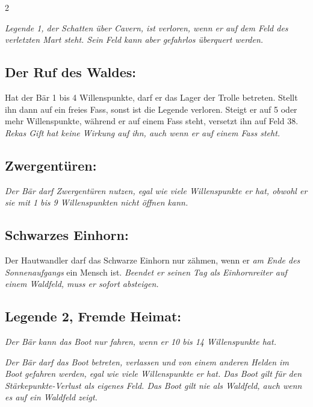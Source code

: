 \documentclass[10pt, a4paper, oneside]{book}
\newcommand{\fan}[1]{\textit{#1}}
\begin{document}
\begin{multicols*}{2}
\begin{bgcolor}[color-DZ]
\bullet{} \fan{Legende 1, der Schatten über Cavern, ist verloren, wenn er auf dem Feld des verletzten Mart steht. Sein Feld kann aber gefahrlos überquert werden.}



\subsection{Der Ruf des Waldes:}

Hat der Bär 1 bis 4 Willenspunkte, darf er das Lager der Trolle betreten. Stellt ihn dann auf ein freies Fass, sonst ist die Legende verloren. Steigt er auf 5 oder mehr Willenspunkte, während er auf einem Fass steht, versetzt ihn auf Feld 38. 
\supercite{DZ:Begleitheft}
\fan{Rekas Gift hat keine Wirkung auf ihn, auch wenn er auf einem Fass steht.}





\subsection{Zwergentüren:}

\fan{Der Bär darf Zwergentüren nutzen, egal wie viele Willenspunkte er hat, obwohl er sie mit 1 bis 9 Willenspunkten nicht öffnen kann.}




\subsection{Schwarzes Einhorn:}

Der Hautwandler darf das Schwarze Einhorn nur zähmen, wenn er \fan{am Ende des Sonnenaufgangs} ein Mensch ist.
\supercite{DZ:Begleitheft}
\fan{Beendet er seinen Tag als Einhornreiter auf einem Waldfeld, muss er sofort absteigen.}






\subsection{Legende 2, Fremde Heimat:}

\fan{Der Bär kann das Boot nur fahren, wenn er 10 bis 14 Willenspunkte hat.}

\fan{Der Bär darf das Boot betreten, verlassen und von einem anderen Helden im Boot gefahren werden, egal wie viele Willenspunkte er hat. Das Boot gilt für den Stärkepunkte-Verlust als eigenes Feld. Das Boot gilt nie als Waldfeld, auch wenn es auf ein Waldfeld zeigt.}





\end{bgcolor}
\end{multicols*}
\end{document}
